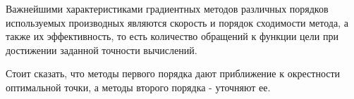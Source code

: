 \documentclass[../body.tex]{subfiles}
\begin{document}
Важнейшими характеристиками градиентных методов различных порядков используемых производных являются скорость и порядок сходимости метода, а также их эффективность, то есть количество обращений к функции цели при достижении заданной точности вычислений.

Стоит сказать, что методы первого порядка дают приближение к окрестности оптимальной точки, а методы второго порядка - уточняют ее.
\end{document}
